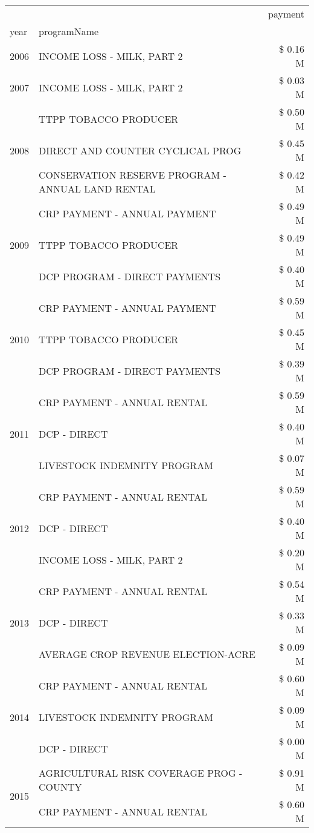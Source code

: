 \begin{tabular}{llr}
\toprule
 &  & payment \\
year & programName &  \\
\midrule
2006 & INCOME LOSS - MILK, PART 2 & \$ 0.16 M \\
\cline{1-3}
2007 & INCOME LOSS - MILK, PART 2 & \$ 0.03 M \\
\cline{1-3}
\multirow[t]{3}{*}{2008} & TTPP TOBACCO PRODUCER & \$ 0.50 M \\
 & DIRECT AND COUNTER CYCLICAL PROG & \$ 0.45 M \\
 & CONSERVATION RESERVE PROGRAM - ANNUAL LAND RENTAL & \$ 0.42 M \\
\cline{1-3}
\multirow[t]{3}{*}{2009} & CRP PAYMENT - ANNUAL PAYMENT & \$ 0.49 M \\
 & TTPP TOBACCO PRODUCER & \$ 0.49 M \\
 & DCP PROGRAM - DIRECT PAYMENTS & \$ 0.40 M \\
\cline{1-3}
\multirow[t]{3}{*}{2010} & CRP PAYMENT - ANNUAL PAYMENT & \$ 0.59 M \\
 & TTPP TOBACCO PRODUCER & \$ 0.45 M \\
 & DCP PROGRAM - DIRECT PAYMENTS & \$ 0.39 M \\
\cline{1-3}
\multirow[t]{3}{*}{2011} & CRP PAYMENT - ANNUAL RENTAL & \$ 0.59 M \\
 & DCP - DIRECT & \$ 0.40 M \\
 & LIVESTOCK INDEMNITY PROGRAM & \$ 0.07 M \\
\cline{1-3}
\multirow[t]{3}{*}{2012} & CRP PAYMENT - ANNUAL RENTAL & \$ 0.59 M \\
 & DCP - DIRECT & \$ 0.40 M \\
 & INCOME LOSS - MILK, PART 2 & \$ 0.20 M \\
\cline{1-3}
\multirow[t]{3}{*}{2013} & CRP PAYMENT - ANNUAL RENTAL & \$ 0.54 M \\
 & DCP - DIRECT & \$ 0.33 M \\
 & AVERAGE CROP REVENUE ELECTION-ACRE & \$ 0.09 M \\
\cline{1-3}
\multirow[t]{3}{*}{2014} & CRP PAYMENT - ANNUAL RENTAL & \$ 0.60 M \\
 & LIVESTOCK INDEMNITY PROGRAM & \$ 0.09 M \\
 & DCP - DIRECT & \$ 0.00 M \\
\cline{1-3}
\multirow[t]{3}{*}{2015} & AGRICULTURAL RISK COVERAGE PROG - COUNTY & \$ 0.91 M \\
 & CRP PAYMENT - ANNUAL RENTAL & \$ 0.60 M \\

\end{tabular}
